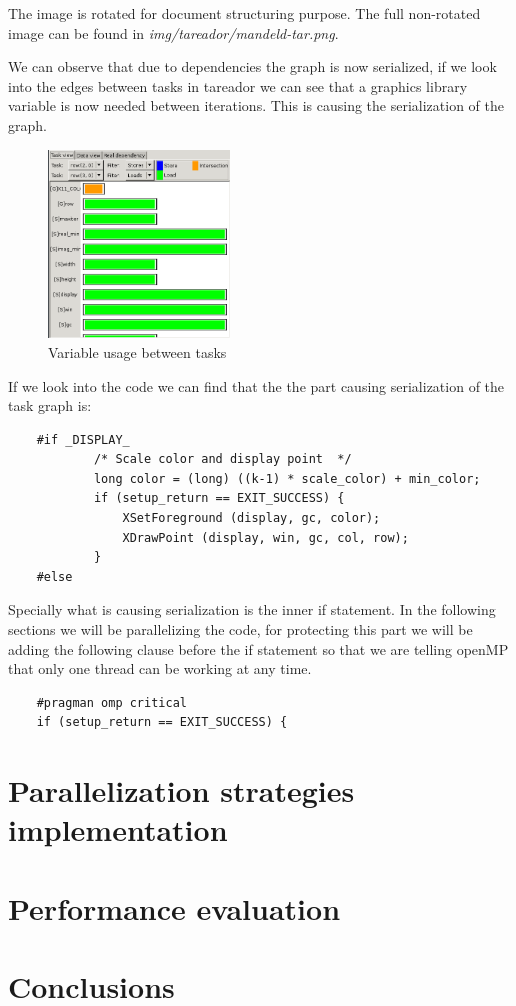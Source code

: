 \documentclass{article}
\begin{document}
\begin{flushleft}
The image is rotated for document structuring purpose. The full non-rotated image can be found in \textit{img/tareador/mandeld-tar.png}.
\end{flushleft}
\begin{flushleft}
We can observe that due to dependencies the graph is now serialized, if we look into the edges between tasks in tareador we can see that a graphics library variable is now needed between iterations. This is causing the serialization of the graph.
\end{flushleft}
\begin{figure}[ht]
    \centering
    \includegraphics[width=0.43\textwidth]{mandeld-tar-edge.png}
    \caption{Variable usage between tasks}
    \label{fig:mandeldtaredge}
\end{figure}
\begin{flushleft}
If we look into the code we can find that the the part causing serialization of the task graph is:
\end{flushleft}
\begin{lstlisting}
    #if _DISPLAY_
            /* Scale color and display point  */
            long color = (long) ((k-1) * scale_color) + min_color;
            if (setup_return == EXIT_SUCCESS) {
                XSetForeground (display, gc, color);
                XDrawPoint (display, win, gc, col, row);
            }
    #else
\end{lstlisting}
\begin{flushleft}
Specially what is causing serialization is the inner if statement. In the following sections we will be parallelizing the code, for protecting this part we will be adding the following clause before the if statement so that we are telling openMP that only one thread can be working at any time.
\end{flushleft}
\begin{lstlisting}
    #pragman omp critical
    if (setup_return == EXIT_SUCCESS) {
\end{lstlisting}
\newpage
\section{Parallelization strategies implementation}
\section{Performance evaluation}
\section{Conclusions}
\end{document}
